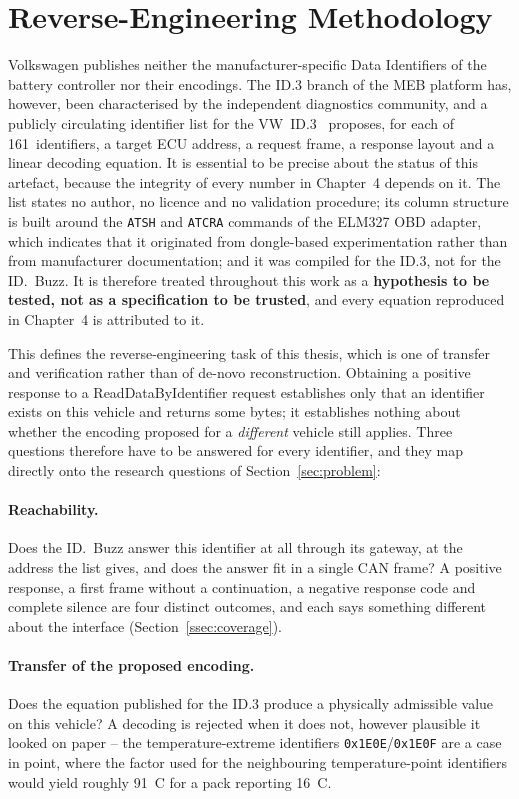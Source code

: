 \documentclass[11pt,a4paper,oneside,parskip=half]{scrreprt}
\providecommand{\hex}{}\renewcommand{\hex}[1]{\texttt{0x#1}}
\begin{document}
\section{Reverse-Engineering Methodology}
\label{sec:re_methodology}
Volkswagen publishes neither the manufacturer-specific Data Identifiers of the battery controller nor their encodings. The ID.3 branch of the MEB platform has, however, been characterised by the independent diagnostics community, and a publicly circulating identifier list for the VW~ID.3~\cite{vwmebpidlist} proposes, for each of 161~identifiers, a target ECU address, a request frame, a response layout and a linear decoding equation. It is essential to be precise about the status of this artefact, because the integrity of every number in Chapter~4 depends on it. The list states no author, no licence and no validation procedure; its column structure is built around the \texttt{ATSH} and \texttt{ATCRA} commands of the ELM327 OBD adapter, which indicates that it originated from dongle-based experimentation rather than from manufacturer documentation; and it was compiled for the ID.3, not for the ID.~Buzz. It is therefore treated throughout this work as a \textbf{hypothesis to be tested, not as a specification to be trusted}, and every equation reproduced in Chapter~4 is attributed to it.

This defines the reverse-engineering task of this thesis, which is one of transfer and verification rather than of de-novo reconstruction. Obtaining a positive response to a ReadDataByIdentifier request establishes only that an identifier exists on this vehicle and returns some bytes; it establishes nothing about whether the encoding proposed for a \emph{different} vehicle still applies. Three questions therefore have to be answered for every identifier, and they map directly onto the research questions of Section~\ref{sec:problem}:

\paragraph{Reachability.} Does the ID.~Buzz answer this identifier at all through its gateway, at the address the list gives, and does the answer fit in a single CAN frame? A positive response, a first frame without a continuation, a negative response code and complete silence are four distinct outcomes, and each says something different about the interface (Section~\ref{ssec:coverage}).

\paragraph{Transfer of the proposed encoding.} Does the equation published for the ID.3 produce a physically admissible value on this vehicle? A decoding is rejected when it does not, however plausible it looked on paper -- the temperature-extreme identifiers \hex{1E0E}/\hex{1E0F} are a case in point, where the factor used for the neighbouring temperature-point identifiers would yield roughly 91~\textdegree C for a pack reporting 16~\textdegree C.
\end{document}
